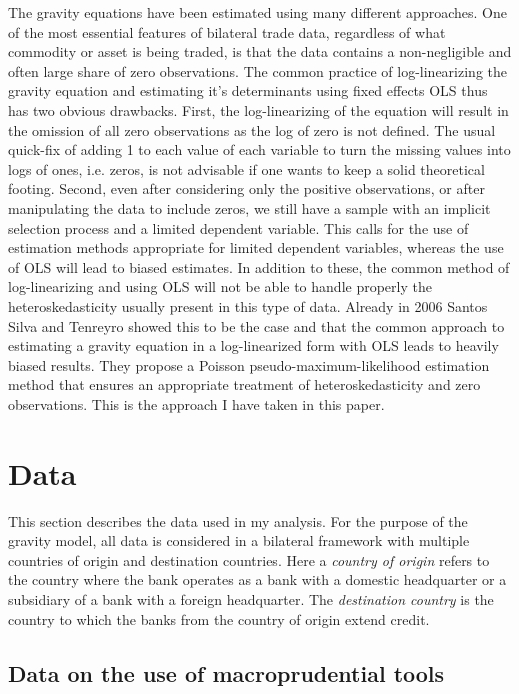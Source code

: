 \documentclass[12pt,a4paper]{article}
\begin{document}
The gravity equations have been estimated using many different approaches. One of the most essential features of bilateral trade data, regardless of what commodity or asset is being traded, is that the data contains a non-negligible and often large share of zero observations. The common practice of log-linearizing the gravity equation and estimating it's determinants using fixed effects OLS thus has two obvious drawbacks. First, the log-linearizing of the equation will result in the omission of all zero observations as the log of zero is not defined. The usual quick-fix of adding 1 to each value of each variable to turn the missing values into logs of ones, i.e. zeros, is not advisable if one wants to keep a solid theoretical footing. Second, even after considering only the positive observations, or after manipulating the data to include zeros, we still have a sample with an implicit selection process and a limited dependent variable. This calls for the use of estimation methods appropriate for limited dependent variables, whereas the use of OLS will lead to biased estimates. In addition to these, the common method of log-linearizing and using OLS will not be able to handle properly the heteroskedasticity usually present in this type of data. Already in 2006 Santos Silva and Tenreyro showed this to be the case and that the common approach to estimating a gravity equation in a log-linearized form with OLS leads to heavily biased results. They propose a Poisson pseudo-maximum-likelihood estimation method that ensures an appropriate treatment of heteroskedasticity and zero observations. This is the approach I have taken in this paper. 

\newpage
\section{Data}

This section describes the data used in my analysis. For the purpose of the gravity model, all data is considered in a bilateral framework with multiple countries of origin and destination countries. Here a \textit{country of origin }refers to the country where the bank operates as a bank with a domestic headquarter or a subsidiary of a bank with a foreign headquarter. The \textit{destination country} is the country to which the banks from the country of origin extend credit. 

\subsection{Data on the use of macroprudential tools}
\end{document}
